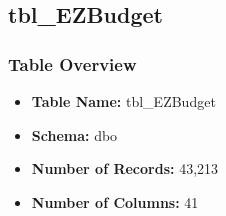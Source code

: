 \begin{landscape}
\subsection{tbl\_EZBudget}

\subsubsection{Table Overview}
\begin{itemize}
\item \textbf{Table Name:} tbl\_EZBudget
\item \textbf{Schema:} dbo
\item \textbf{Number of Records:} 43,213
\item \textbf{Number of Columns:} 41
\end{itemize}


\end{landscape}
